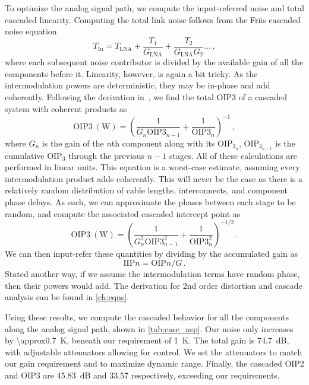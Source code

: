 To optimize the analog signal path, we compute the input-referred noise and total cascaded linearity.
Computing the total link noise follows from the Friis cascaded noise equation
\begin{equation}
    T_\text{In} = T_\text{LNA} + \frac{T_1}{G_\text{LNA}} + \frac{T_2}{G_\text{LNA}G_2} \dots \,,
\end{equation}
where each subsequent noise contributor is divided by the available gain of all the components before it.
Linearity, however, is again a bit tricky.
As the intermodulation powers are deterministic, they may be in-phase and add coherently.
Following the derivation in~\cite{pozarMicrowaveEngineering2012}, we find the total OIP3 of a cascaded system with coherent products as
\begin{equation}
    \text{OIP3}~(\text{W}) = \left(
    \frac{1}{G_n\text{OIP3}_{{n-1}}} + \frac{1}{\text{OIP3}_{n}}
    \right)^{-1} \,,
\end{equation}
where $G_n$ is the gain of the $n$th component along with its $\text{OIP}_{3_n}$, $\text{OIP}_{3_{n-1}}$ is the cumulative OIP$_3$ through the previous $n-1$ stages.
All of these calculations are performed in linear units.
This equation is a worst-case estimate, assuming every intermodulation product adds coherently.
This will never be the case as there is a relatively random distribution of cable lengths, interconnects, and component phase delays.
As such, we can approximate the phases between each stage to be random, and compute the associated cascaded intercept point as
\begin{equation}
    \text{OIP3}~(\text{W}) = \left(
    \frac{1}{G_n^2\text{OIP3}_{{n-1}}^2} + \frac{1}{\text{OIP3}_{n}^2}
    \right)^{-1/2} \,.
\end{equation}
We can then input-refer these quantities by dividing by the accumulated gain as
\begin{equation}
    \text{IIP}n = \text{OIP}n /G \,.
\end{equation}
Stated another way, if we assume the intermodulation terms have random phase, then their powers would add.
The derivation for 2nd order distortion and cascade analysis can be found in \autoref{ch:eqns}.

Using these results, we compute the cascaded behavior for all the components along the analog signal path, shown in \autoref{tab:casc_asp}.
Our noise only increases by \qty{\approx0.7}{\K}, beneath our requirement of \qty{1}{\K}.
The total gain is \qty{74.7}{\dB}, with adjustable attenuators allowing for control.
We set the attenuators to match our gain requirement and to maximize dynamic range.
Finally, the cascaded OIP2 and OIP3 are \qty{45.83}{\dB} and \qty{33.57}{\dBm} respectively, exceeding our requirements.

